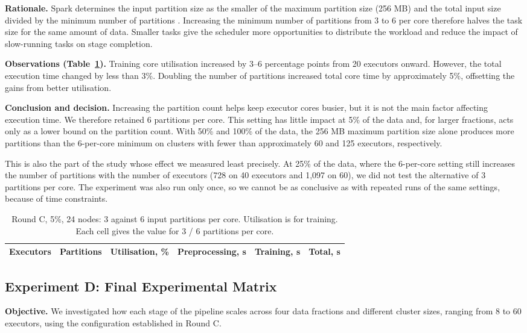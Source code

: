 \documentclass[a4paper, 11pt]{article} %
\begin{document}
\textbf{Rationale.} Spark determines the input partition size as the smaller of the maximum partition size (256 MB) and the total input size divided by the minimum number of partitions \cite{spark2024tuning}. Increasing the minimum number of partitions from 3 to 6 per core therefore halves the task size for the same amount of data. Smaller tasks give the scheduler more opportunities to distribute the workload and reduce the impact of slow-running tasks on stage completion.

\textbf{Observations (Table~\ref{tab:partitions}).} Training core utilisation increased by 3--6 percentage points from 20 executors onward. However, the total execution time changed by less than 3\%. Doubling the number of partitions increased total core time by approximately 5\%, offsetting the gains from better utilisation.

\textbf{Conclusion and decision.} Increasing the partition count helps keep executor cores busier, but it is not the main factor affecting execution time. We therefore retained 6 partitions per core. This setting has little impact at 5\% of the data and, for larger fractions, acts only as a lower bound on the partition count. With 50\% and 100\% of the data, the 256 MB maximum partition size alone produces more partitions than the 6-per-core minimum on clusters with fewer than approximately 60 and 125 executors, respectively.

This is also the part of the study whose effect we measured least precisely. At 25\% of the data, where the 6-per-core setting still increases the number of partitions with the number of executors (728 on 40 executors and 1,097 on 60), we did not test the alternative of 3 partitions per core. The experiment was also run only once, so we cannot be as conclusive as with repeated runs of the same settings, because of time constraints.

\begin{table}[H]
\centering
\footnotesize
\begin{tabular}{@{}rrrrrr@{}}
\hline
Executors & Partitions & Utilisation, \% & Preprocessing, s & Training, s & Total, s \\
\hline

\end{tabular}
\caption{Round C, 5\%, 24 nodes: 3 against 6 input partitions per core. Utilisation is for training. Each cell gives the value for 3 / 6 partitions per core.}
\label{tab:partitions}
\end{table}

\subsection{Experiment D: Final Experimental Matrix}
\textbf{Objective.} We investigated how each stage of the pipeline scales across four data fractions and different cluster sizes, ranging from 8 to 60 executors, using the configuration established in Round C.
\end{document}
